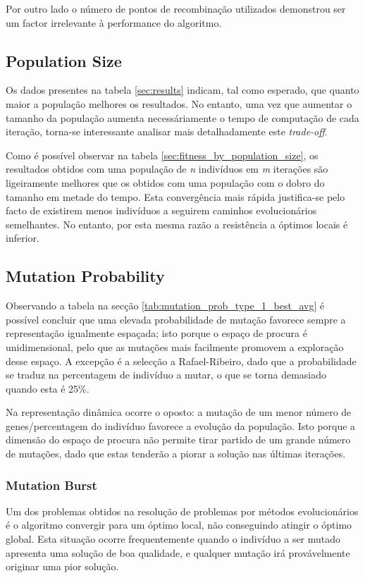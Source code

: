 \documentclass[a4paper]{article}
\begin{document}
\indent Por outro lado o número de pontos de recombinação utilizados demonstrou ser um factor irrelevante à performance do algoritmo.

\cleardoublepage
\subsection{Population Size}
\indent \indent Os dados presentes na tabela \ref{sec:results} indicam, tal como esperado, que quanto maior a população melhores
os resultados. No entanto, uma vez que aumentar o tamanho da população aumenta necessáriamente
o tempo de computação de cada iteração, torna-se interessante analisar mais detalhadamente este \emph{trade-off}.

\indent Como é possível observar na tabela \ref{sec:fitness_by_population_size}, os resultados obtidos com uma
população de \emph{n} indivíduos em \emph{m} iterações são ligeiramente melhores que os obtidos
com uma população com o dobro do tamanho em metade do tempo. Esta convergência mais rápida justifica-se
pelo facto de existirem menos indivíduos a seguirem caminhos evolucionários semelhantes. No entanto, por esta
mesma razão a resistência a óptimos locais é inferior.
 
\cleardoublepage

\subsection{Mutation Probability}
\indent \indent Observando a tabela na secção \ref{tab:mutation_prob_type_1_best_avg} é possível concluir que uma elevada probabilidade de mutação favorece sempre
a representação igualmente espaçada; isto porque o espaço de procura é unidimensional, pelo que as mutações mais facilmente promovem a exploração desse espaço.
A excepção é a selecção a Rafael-Ribeiro, dado que a probabilidade se traduz na percentagem de indivíduo a mutar, o que se torna demasiado quando esta é 25\%.

Na representação dinâmica ocorre o oposto: a mutação de um menor número de genes/percentagem do indivíduo favorece a evolução da população. Isto porque a dimensão
do espaço de procura não permite tirar partido de um grande número de mutações, dado que estas tenderão a piorar a solução nas últimas iterações.

\subsubsection{Mutation Burst}
\indent \indent Um dos problemas obtidos na resolução de problemas por métodos evolucionários é o algoritmo
convergir para um óptimo local, não conseguindo atingir o óptimo global. Esta situação ocorre frequentemente
quando o indivíduo a ser mutado apresenta uma solução de boa qualidade, e qualquer mutação irá provávelmente originar
uma pior solução.
\end{document}
